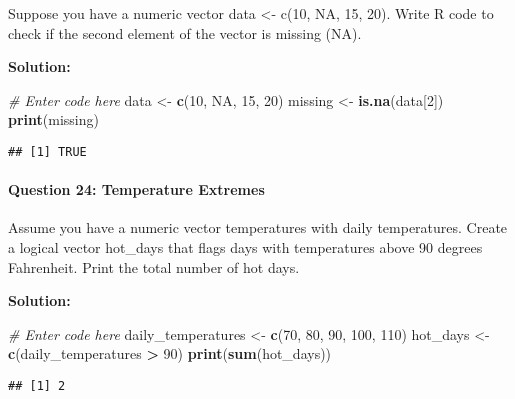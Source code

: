 \documentclass[
]{article}
\newenvironment{Shaded}{\begin{snugshade}}{\end{snugshade}}
\newcommand{\CommentTok}[1]{\textcolor[rgb]{0.56,0.35,0.01}{\textit{#1}}}
\newcommand{\ConstantTok}[1]{\textcolor[rgb]{0.56,0.35,0.01}{#1}}
\newcommand{\DecValTok}[1]{\textcolor[rgb]{0.00,0.00,0.81}{#1}}
\newcommand{\FunctionTok}[1]{\textcolor[rgb]{0.13,0.29,0.53}{\textbf{#1}}}
\newcommand{\NormalTok}[1]{#1}
\newcommand{\OtherTok}[1]{\textcolor[rgb]{0.56,0.35,0.01}{#1}}
\newcommand{\SpecialCharTok}[1]{\textcolor[rgb]{0.81,0.36,0.00}{\textbf{#1}}}
\begin{document}
Suppose you have a numeric vector data \textless- c(10, NA, 15, 20).
Write R code to check if the second element of the vector is missing
(NA).

\textbf{Solution:}

\begin{Shaded}
\begin{Highlighting}[]
\CommentTok{\# Enter code here}
\NormalTok{data }\OtherTok{\textless{}{-}} \FunctionTok{c}\NormalTok{(}\DecValTok{10}\NormalTok{, }\ConstantTok{NA}\NormalTok{, }\DecValTok{15}\NormalTok{, }\DecValTok{20}\NormalTok{)}
\NormalTok{missing }\OtherTok{\textless{}{-}} \FunctionTok{is.na}\NormalTok{(data[}\DecValTok{2}\NormalTok{])}
\FunctionTok{print}\NormalTok{(missing)}
\end{Highlighting}
\end{Shaded}

\begin{verbatim}
## [1] TRUE
\end{verbatim}

\hypertarget{question-24-temperature-extremes}{%
\paragraph{Question 24: Temperature
Extremes}\label{question-24-temperature-extremes}}

Assume you have a numeric vector temperatures with daily temperatures.
Create a logical vector hot\_days that flags days with temperatures
above 90 degrees Fahrenheit. Print the total number of hot days.

\textbf{Solution:}

\begin{Shaded}
\begin{Highlighting}[]
\CommentTok{\# Enter code here}
\NormalTok{daily\_temperatures }\OtherTok{\textless{}{-}} \FunctionTok{c}\NormalTok{(}\DecValTok{70}\NormalTok{, }\DecValTok{80}\NormalTok{, }\DecValTok{90}\NormalTok{, }\DecValTok{100}\NormalTok{, }\DecValTok{110}\NormalTok{)}
\NormalTok{hot\_days }\OtherTok{\textless{}{-}} \FunctionTok{c}\NormalTok{(daily\_temperatures }\SpecialCharTok{\textgreater{}} \DecValTok{90}\NormalTok{)}
\FunctionTok{print}\NormalTok{(}\FunctionTok{sum}\NormalTok{(hot\_days))}
\end{Highlighting}
\end{Shaded}

\begin{verbatim}
## [1] 2
\end{verbatim}
\end{document}
